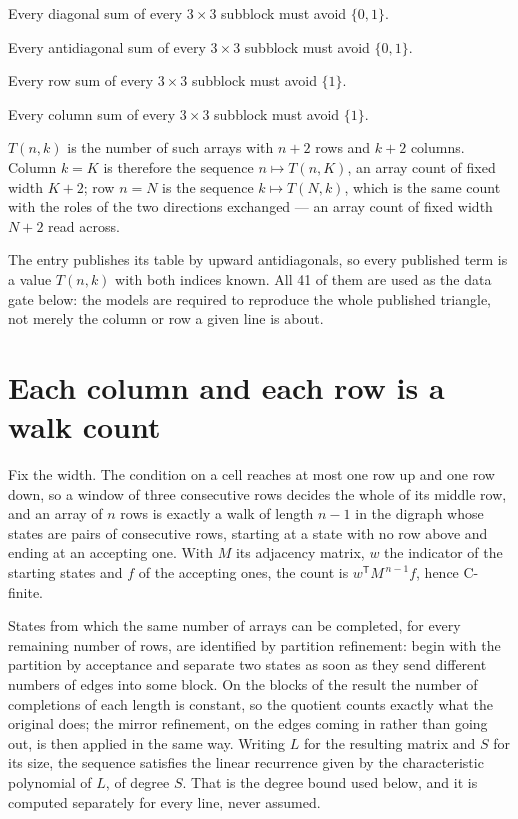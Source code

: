 \documentclass[11pt]{article}
\theoremstyle{definition}
\begin{document}
Every diagonal sum of every $3\times3$ subblock must avoid $\{0, 1\}$.

Every antidiagonal sum of every $3\times3$ subblock must avoid $\{0, 1\}$.

Every row sum of every $3\times3$ subblock must avoid $\{1\}$.

Every column sum of every $3\times3$ subblock must avoid $\{1\}$.

$T(n,k)$ is the number of such arrays with $n + 2$ rows and $k + 2$ columns. Column $k = K$ is therefore the sequence $n \mapsto T(n,K)$, an array count of fixed width $K + 2$; row $n = N$ is the sequence $k \mapsto T(N,k)$, which is the same count with the roles of the two directions exchanged --- an array count of fixed width $N + 2$ read across.

The entry publishes its table by upward antidiagonals, so every published term is a value $T(n,k)$ with both indices known. All 41 of them are used as the data gate below: the models are required to reproduce the whole published triangle, not merely the column or row a given line is about.

\section{Each column and each row is a walk count}

Fix the width. The condition on a cell reaches at most one row up and one row down, so a window of three consecutive rows decides the whole of its middle row, and an array of $n$ rows is exactly a walk of length $n-1$ in the digraph whose states are pairs of consecutive rows, starting at a state with no row above and ending at an accepting one. With $M$ its adjacency matrix, $w$ the indicator of the starting states and $f$ of the accepting ones, the count is $w^{\mathsf T}M^{\,n-1}f$, hence C-finite.

States from which the same number of arrays can be completed, for every remaining number of rows, are identified by partition refinement: begin with the partition by acceptance and separate two states as soon as they send different numbers of edges into some block. On the blocks of the result the number of completions of each length is constant, so the quotient counts exactly what the original does; the mirror refinement, on the edges coming in rather than going out, is then applied in the same way. Writing $L$ for the resulting matrix and $S$ for its size, the sequence satisfies the linear recurrence given by the characteristic polynomial of $L$, of degree $S$. That is the degree bound used below, and it is computed separately for every line, never assumed.
\end{document}
